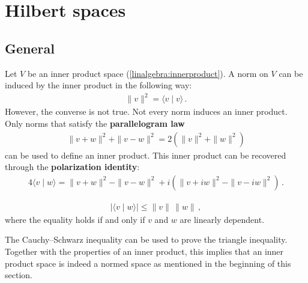 \section{Hilbert spaces}
\subsection{General}

    \begin{remark}
        Let $V$ be an inner product space (\cref{linalgebra:innerproduct}). A norm on $V$ can be induced by the inner product in the following way:
        \begin{gather}
            \label{functional:inner_product_norm}
            \|v\|^2 = \langle v\mid v \rangle\,.
        \end{gather}
        However, the converse is not true. Not every norm induces an inner product. Only norms that satisfy the \textbf{parallelogram law}
        \begin{gather}
            \label{functional:parallellogram_law}
            \|v+w\|^2 + \|v-w\|^2 = 2(\|v\|^2 + \|w\|^2)
        \end{gather}
        can be used to define an inner product. This inner product can be recovered through the \textbf{polarization identity}:
        \begin{gather}
            \label{functional:polarization_identity}
            4\langle v\mid w \rangle = \|v+w\|^2 - \|v-w\|^2 + i\left(\|v+iw\|^2 - \|v-iw\|^2\right)\,.
        \end{gather}
    \end{remark}

    \begin{property}\label{functional:cauchy_schwarz}
        \begin{gather}
            |\langle v\mid w \rangle|\leq\|v\|\,\|w\|\,,
        \end{gather}
        where the equality holds if and only if $v$ and $w$ are linearly dependent.
    \end{property}
    \begin{result}
        The Cauchy--Schwarz inequality can be used to prove the triangle inequality. Together with the properties of an inner product, this implies that an inner product space is indeed a normed space as mentioned in the beginning of this section.
    \end{result}

